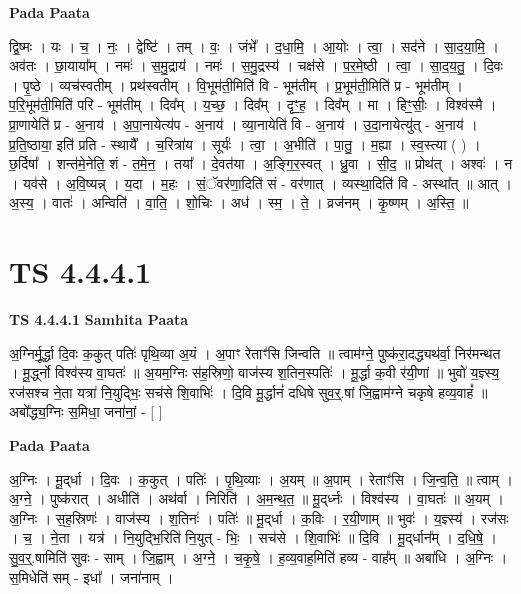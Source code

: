 \documentclass[17pt]{extarticle}
\begin{document}
\textbf{Pada Paata} \newline

द्वि॒ष्मः । यः । च॒ । नः॒ । द्वेष्टि॑ । तम् । वः॒ । जंभे᳚ । द॒धा॒मि॒ । आ॒योः । त्वा॒ । सद॑ने । सा॒द॒या॒मि॒ । अव॑तः । छा॒याया᳚म् । नमः॑ । स॒मु॒द्राय॑ । नमः॑ । स॒मु॒द्रस्य॑ । चक्ष॑से । प॒र॒मे॒ष्ठी । त्वा॒ । सा॒द॒य॒तु॒ । दि॒वः । पृ॒ष्ठे । व्यच॑स्वतीम् । प्रथ॑स्वतीम् । वि॒भूम॑ती॒मिति॑ वि - भूम॑तीम् । प्र॒भूम॑ती॒मिति॑ प्र - भूम॑तीम् । प॒रि॒भूम॑ती॒मिति॑ परि - भूम॑तीम् । दिव᳚म् । य॒च्छ॒ । दिव᳚म् । दृꣳ॒॒ह॒ । दिव᳚म् । मा । हिꣳ॒॒सीः॒ । विश्व॑स्मै । प्रा॒णायेति॑ प्र - अ॒नाय॑ । अ॒पा॒नायेत्य॑प - अ॒नाय॑ । व्या॒नायेति॑ वि - अ॒नाय॑ । उ॒दा॒नायेत्यु॑त् - अ॒नाय॑ । प्र॒ति॒ष्ठाया॒ इति॑ प्रति - स्थायै᳚ । च॒रित्रा॑य । सूर्यः॑ । त्वा॒ । अ॒भीति॑ । पा॒तु॒ । म॒ह्या । स्व॒स्त्या ( ) । छ॒र्दिषा᳚ । शन्त॑मे॒नेति॒ शं - त॒मे॒न॒ । तया᳚ । दे॒वत॑या । अ॒ङ्गि॒र॒स्वत् । ध्रु॒वा । सी॒द॒ ॥ प्रोथ॑त् । अश्वः॑ । न । यव॑से । अ॒वि॒ष्यन्न् । य॒दा । म॒हः । सं॒ॅवर॑णा॒दिति॑ सं - वर॑णात् । व्यस्था॒दिति॑ वि - अस्था᳚त् ॥ आत् । अ॒स्य॒ । वातः॑ । अन्विति॑ । वा॒ति॒ । शो॒चिः । अध॑ । स्म॒ । ते॒ । व्रज॑नम् । कृ॒ष्णम् । अ॒स्ति॒ ॥  \newline





\section{ TS 4.4.4.1 }

\textbf{TS 4.4.4.1 } \newline
\textbf{Samhita Paata} \newline

अ॒ग्निर्मू॒र्द्धा दि॒वः क॒कुत् पतिः॑ पृथि॒व्या अ॒यं । अ॒पाꣳ रेताꣳ॑सि जिन्वति ॥ त्वाम॑ग्ने॒ पुष्क॑रा॒दद्ध्यथ॑र्वा॒ निर॑मन्थत । मू॒र्द्ध्नो विश्व॑स्य वा॒घतः॑ ॥ अ॒यम॒ग्निः स॑ह॒स्रिणो॒ वाज॑स्य श॒तिन॒स्पतिः॑ । मू॒र्द्धा क॒वी र॑यी॒णां ॥ भुवो॑ य॒ज्ञ्स्य॒ रज॑सश्च ने॒ता यत्रा॑ नि॒युद्भिः॒ सच॑से शि॒वाभिः॑ । दि॒वि मू॒र्द्धानं॑ दधिषे सुव॒र्॒.षां जि॒ह्वाम॑ग्ने चकृषे हव्य॒वाहं᳚ ॥ अबो᳚द्ध्य॒ग्निः स॒मिधा॒ जना॑नां॒ - [  ] \newline

\textbf{Pada Paata} \newline

अ॒ग्निः । मू॒द्‌र्धा । दि॒वः । क॒कुत् । पतिः॑ । पृ॒थि॒व्याः । अ॒यम् ॥ अ॒पाम् । रेताꣳ॑सि । जि॒न्व॒ति॒ ॥ त्वाम् । अ॒ग्ने॒ । पुष्क॑रात् । अधीति॑ । अथ॑र्वा । निरिति॑ । अ॒म॒न्थ॒त॒ ॥ मू॒द्‌र्ध्नः । विश्व॑स्य । वा॒घतः॑ ॥ अ॒यम् । अ॒ग्निः । स॒ह॒स्रिणः॑ । वाज॑स्य । श॒तिनः॑ । पतिः॑ ॥ मू॒द्‌र्धा । क॒विः । र॒यी॒णाम् ॥ भुवः॑ । य॒ज्ञ्स्य॑ । रज॑सः । च॒ । ने॒ता । यत्र॑ । नि॒युद्भि॒रिति॑ नि॒युत् - भिः॒ । सच॑से । शि॒वाभिः॑ ॥ दि॒वि । मू॒द्‌र्धान᳚म् । द॒धि॒षे॒ । सु॒व॒र्॒.षामिति॑ सुवः - साम् । जि॒ह्वाम् । अ॒ग्ने॒ । च॒कृ॒षे॒ । ह॒व्य॒वाह॒मिति॑ हव्य - वाह᳚म् ॥ अबा॑धि । अ॒ग्निः । स॒मिधेति॑ सम् - इधा᳚ । जना॑नाम् ।  \newline
\end{document}
